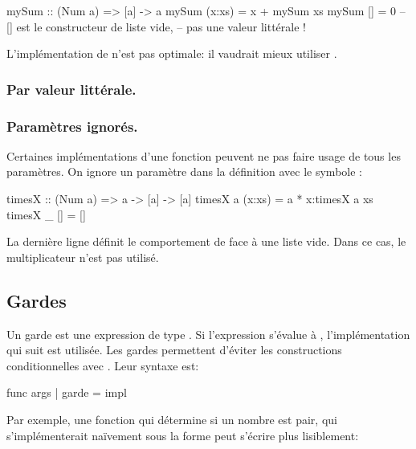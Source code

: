 \begin{haskellcode}
mySum :: (Num a) => [a] -> a
mySum (x:xs) = x + mySum xs
mySum []     = 0 -- [] est le constructeur de liste vide,
                 -- pas une valeur littérale !
\end{haskellcode}

\begin{warnbox}
L'implémentation de  n'est pas optimale: il vaudrait mieux utiliser  .
\end{warnbox}

\subsubsection{Par valeur littérale.}

\subsubsection{Paramètres ignorés.}

Certaines implémentations d'une fonction peuvent ne pas faire usage de tous les paramètres. On ignore un paramètre dans la définition avec le symbole \hs{_}:

\begin{hslisting}
\begin{haskellcode}
timesX :: (Num a) => a -> [a] -> [a]
timesX a (x:xs) = a * x:timesX a xs
timesX _ []     = []
\end{haskellcode}
\caption {La dernière ligne définit le comportement de  face à une liste vide. Dans ce cas, le multiplicateur n'est pas utilisé.}
\end{hslisting}

\subsection{Gardes}
\label{guards}

Un garde est une expression de type . Si l'expression s'évalue à , l'implémentation qui suit est utilisée. Les gardes permettent d'éviter les constructions conditionnelles avec  . Leur syntaxe est:

\begin{haskellcode}
func args | garde = impl
\end{haskellcode}

Par exemple, une fonction qui détermine si un nombre est pair, qui s'implémenterait naïvement sous la forme  peut s'écrire plus lisiblement:

